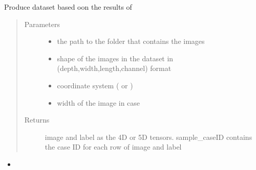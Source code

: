 \documentclass[letterpaper,10pt,english]{sphinxmanual}
\begin{document}

\begin{fulllineitems}
\label{\detokenize{index:util.load_data.make_dataset}}
Produce dataset based oon the results of {\hyperref[\detokenize{index:module-util.process_oct_folder}]{}}
\begin{quote}\begin{description}
\item[{Parameters}] \leavevmode\begin{itemize}
\item {} 
 \textendash{} the path to the folder that contains the images

\item {} 
 \textendash{} shape of the images in the dataset in (depth,width,length,channel) format

\item {} 
 \textendash{} coordinate system ( or )

\item {} 
 \textendash{} width of the image in case 

\end{itemize}

\item[{Returns}] \leavevmode
image and label as the 4D or 5D tensors.  sample\_caseID contains the case ID for each row of image and label

\end{description}\end{quote}



\begin{itemize}
\item {} 
{\hyperref[\detokenize{index:module-util.process_oct_folder}]{}}

\end{itemize}



\end{fulllineitems}
\end{document}
